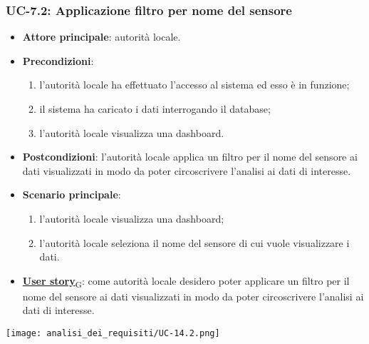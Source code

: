 \subsubsection{UC-7.2: Applicazione filtro per nome del sensore}
\begin{itemize}
	\item \textbf{Attore principale}: autorità locale.
	\item \textbf{Precondizioni}:
	      \begin{enumerate}
		      \item l'autorità locale ha effettuato l'accesso al sistema ed esso è in funzione;
		      \item il sistema ha caricato i dati interrogando il database;
		      \item l'autorità locale visualizza una dashboard.
	      \end{enumerate}
	\item \textbf{Postcondizioni}: l'autorità locale applica un filtro per il nome del sensore ai dati visualizzati in modo da poter circoscrivere l'analisi ai dati di interesse.
	\item \textbf{Scenario principale}:
	      \begin{enumerate}
		      \item l'autorità locale visualizza una dashboard;
		      \item l'autorità locale seleziona il nome del sensore di cui vuole visualizzare i dati.
	      \end{enumerate}
	\item \href{https://7last.github.io/docs/rtb/documentazione-interna/glossario\#user-story}{\textbf{User story}\textsubscript{G}}:
	      come autorità locale desidero poter applicare un filtro per il nome del sensore ai dati visualizzati in modo da poter circoscrivere l'analisi ai dati di interesse.
\end{itemize}
\begin{center}
	\texttt{[image: analisi\_dei\_requisiti/UC-14.2.png]}
\end{center}

